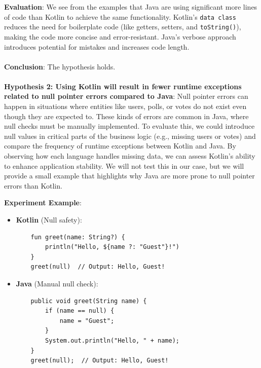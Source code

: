 \textbf{Evaluation}: We see from the examples that Java are using significant more lines of code than Kotlin to achieve the same functionality.  Kotlin's \texttt{data class} reduces the need for boilerplate code (like getters, setters, and \texttt{toString()}), making the code more concise and error-resistant. Java’s verbose approach introduces potential for mistakes and increases code length.
\\
\\
\textbf{Conclusion}: The hypothesis holds. 
\\
\\
\textbf{Hypothesis 2: Using Kotlin will result in fewer runtime exceptions related to null pointer errors compared to Java}:  Null pointer errors can happen in situations where entities like users, polls, or votes do not exist even though they are expected to. These kinds of errors are common in Java, where null checks must be manually implemented. To evaluate this, we could introduce null values in critical parts of the business logic (e.g., missing users or votes) and compare the frequency of runtime exceptions between Kotlin and Java. By observing how each language handles missing data, we can assess Kotlin’s ability to enhance application stability. We will not test this in our case, but we will provide a small example that highlights why Java are more prone to null pointer errors than Kotlin.

\textbf{Experiment Example}:
\begin{itemize}
    \item \textbf{Kotlin} (Null safety):
    \begin{verbatim}
    fun greet(name: String?) {
        println("Hello, ${name ?: "Guest"}!")
    }
    greet(null)  // Output: Hello, Guest!
    \end{verbatim}
    
    \item \textbf{Java} (Manual null check):
    \begin{verbatim}
    public void greet(String name) {
        if (name == null) {
            name = "Guest";
        }
        System.out.println("Hello, " + name);
    }
    greet(null);  // Output: Hello, Guest!
    \end{verbatim}
\end{itemize}

